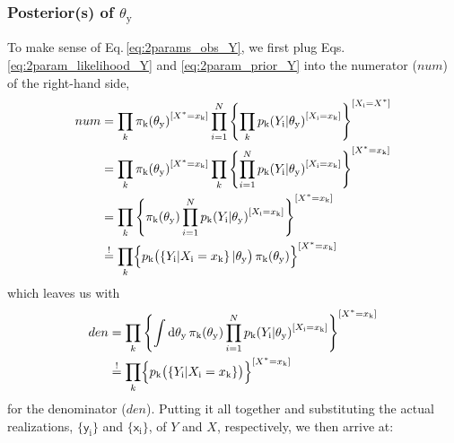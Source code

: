 \documentclass[]{report}
\begin{document}
\subsubsection{Posterior(s) of $\theta_\mathrm{y}$}
To make sense of Eq.\,\ref{eq:2params_obs_Y}, we first plug Eqs.\,\ref{eq:2param_likelihood_Y} and \ref{eq:2param_prior_Y} into the numerator ($num$) of the right-hand side,
\begin{align}
num 
&=
\prod_{k}
	{
		\pi_\mathrm{k}( \theta_\mathrm{y} )
	}
    ^
    {
		[ X^* = x_\mathrm{k} ]
	}
\prod_{i=1}^{N}
	\left\{
		\prod_{k}
			{
				p_\mathrm{k}( Y_\mathrm{i} | \theta_\mathrm{y} )
			}
		    ^
		    {
				[ X_\mathrm{i} = x_\mathrm{k} ]
			}
	\right\}
	^
	{
		[ X_\mathrm{i} = X^* ]
	}
\nonumber \\
&=
\prod_{k}
	{
		\pi_\mathrm{k}( \theta_\mathrm{y} )
	}
    ^
    {
		[ X^* = x_\mathrm{k} ]
	}
\prod_{k}
	\left\{
		\prod_{i=1}^{N}
			{
				p_\mathrm{k}( Y_\mathrm{i} | \theta_\mathrm{y} )
			}
			^
			{
				[ X_\mathrm{i} = x_\mathrm{k} ]
			}
	\right\}
	^
	{
		[ X^* = x_\mathrm{k} ]
	}
\nonumber \\
&=
\prod_{k}
	\left\{
		\pi_\mathrm{k}( \theta_\mathrm{y} )
		\prod_{i=1}^{N}
			{
				p_\mathrm{k}( Y_\mathrm{i} |\theta_\mathrm{y} )
			}
			^
			{
				[ X_\mathrm{i} = x_\mathrm{k} ]
			}
	\right\}
	^
	{
		[ X^* = x_\mathrm{k} ]
	}
\nonumber \\
&\stackrel{!}{=}
\prod_{k}
	\Bigl\{
		p_\mathrm{k}
			\bigl(
				\left\{ Y_\mathrm{i} | X_\mathrm{i} = x_\mathrm{k} \right\} |
				\theta_\mathrm{y}
			\bigr) \,
		\pi_\mathrm{k}( \theta_\mathrm{y} )
	\Bigr\}
	^
	{
		[ X^* = x_\mathrm{k} ]
	}
\end{align}
which leaves us with
\begin{align}
den 
&= 
\prod_{k}
	\left\{
		\int \mathrm{d}\theta_\mathrm{y} \,
			\pi_\mathrm{k}( \theta_\mathrm{y} )
			\prod_{i=1}^{N}
				{
					p_\mathrm{k}( Y_\mathrm{i} | \theta_\mathrm{y} )
				}
				^
				{
					[ X_\mathrm{i} = x_\mathrm{k} ]
				}
	\right\}
	^
	{
		[ X^* = x_\mathrm{k} ]
	} 
\nonumber \\
&\stackrel{!}{=}
\prod_{k}
	\Bigl\{
		p_\mathrm{k}
			\bigl(
			\left\{ Y_\mathrm{i} | X_\mathrm{i} = x_\mathrm{k} \right\}
			\bigr)
	\Bigr\}
	^
	{
		[ X^* = x_\mathrm{k} ]
	}
\end{align}
for the denominator ($den$). Putting it all together and substituting the actual realizations, $ \{ \mathsf{y}_\mathrm{i} \} $ and $ \{ \mathsf{x}_\mathrm{i} \} $, of $Y$ and $X$, respectively, we then arrive at:
\end{document}
